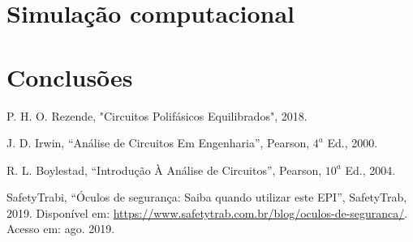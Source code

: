 \documentclass[a4paper,12pt,oneside,openany,table,xcdraw]{article}
\begin{document}
\newpage
\section{Simulação computacional} %



\section{Conclusões} %


\newpage
\begin{thebibliography}{9} 
    P. H. O. Rezende,
    "Circuitos Polifásicos Equilibrados", 2018.

    J. D. Irwin,
    “Análise de Circuitos Em Engenharia”, Pearson, $4^a$ Ed., 2000.

    R. L. Boylestad,
    “Introdução À Análise de Circuitos”, Pearson, $10^a$ Ed., 2004.

    SafetyTrabi,
    “Óculos de segurança: Saiba quando utilizar este EPI”, SafetyTrab, 2019.
 Disponível em:
 \url{https://www.safetytrab.com.br/blog/oculos-de-seguranca/}. Acesso em: ago. 2019.


\end{thebibliography}
\end{document}
